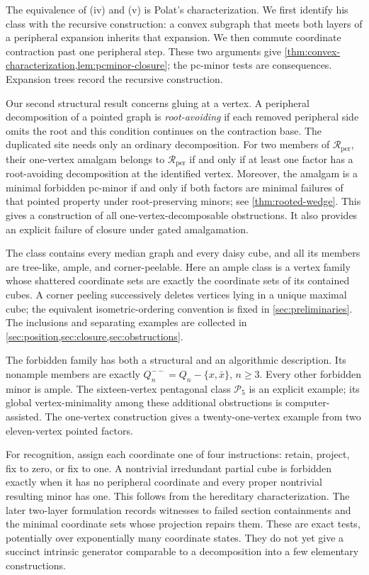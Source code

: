 \documentclass[11pt]{article}
\theoremstyle{definition}
\theoremstyle{remark}
\newcommand{\Rper}{\mathcal R_{\mathrm{per}}}
\begin{document}
The equivalence of (iv) and (v) is Polat's characterization. We first identify
his class with the recursive construction: a convex subgraph that meets both
layers of a peripheral expansion inherits that expansion. We then commute
coordinate contraction past one peripheral step. These two arguments give
\cref{thm:convex-characterization,lem:pcminor-closure}; the pc-minor tests
are consequences. Expansion trees record the recursive construction.

Our second structural result concerns gluing at a vertex. A peripheral
decomposition of a pointed graph is \emph{root-avoiding} if each removed
peripheral side omits the root and this condition continues on the
contraction base. The duplicated site needs only an ordinary decomposition.
For two members of \(\Rper\), their one-vertex amalgam belongs to \(\Rper\)
if and only if at least one factor has a root-avoiding decomposition at the
identified vertex. Moreover, the amalgam is a minimal forbidden pc-minor
if and only if both factors are minimal failures of that pointed property
under root-preserving minors; see \cref{thm:rooted-wedge}. This gives a
construction of all one-vertex-decomposable obstructions. It also provides
an explicit failure of closure under gated amalgamation.

The class contains every median graph and every daisy cube, and all its
members are tree-like, ample, and corner-peelable. Here an ample class is a
vertex family whose shattered coordinate sets are exactly the coordinate
sets of its contained cubes. A corner peeling successively deletes vertices
lying in a unique maximal cube; the equivalent isometric-ordering convention
is fixed in \cref{sec:preliminaries}. The inclusions and separating examples
are collected in \cref{sec:position,sec:closure,sec:obstructions}.

The forbidden family has both a structural and an algorithmic description.
Its nonample members are exactly
\(Q_n^{--}=Q_n-\{x,\bar x\}\), \(n\ge3\). Every other forbidden minor is
ample. The sixteen-vertex pentagonal class \(\mathcal P_5\) is an explicit
example; its global vertex-minimality among these additional obstructions
is computer-assisted. The one-vertex construction gives a twenty-one-vertex
example from two eleven-vertex pointed factors.

For recognition, assign each coordinate one of four instructions: retain,
project, fix to zero, or fix to one. A nontrivial irredundant partial cube
is forbidden exactly when it has no peripheral coordinate and every proper
nontrivial resulting minor has one. This follows from the hereditary
characterization. The later two-layer formulation records witnesses to
failed section containments and the minimal coordinate sets whose
projection repairs them. These are exact tests, potentially over
exponentially many coordinate states. They do not yet give a succinct
intrinsic generator comparable to a decomposition into a few elementary
constructions.
\end{document}
